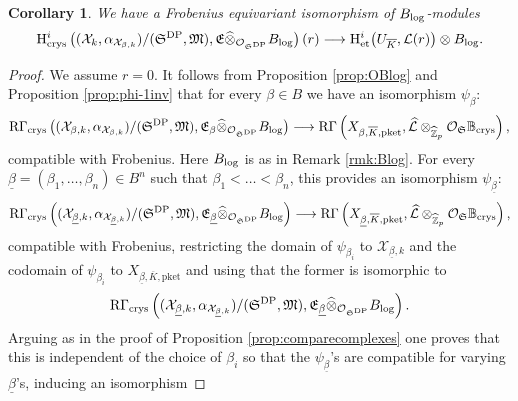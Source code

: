 \documentclass[asterisque,english]{smfart}
\newtheorem{cor}[theo]{Corollary}
\begin{document}
\begin{cor}\label{cor:isoHietcryslog} We have a Frobenius equivariant isomorphism of $B_{\rm log}$-modules $$\mathrm{H}^i_{\mathrm{crys}}\left((\mathcal{X}_k,\alpha_{\mathcal{X}_{\beta,k}})/(\mathfrak{S}^{\rm DP},\mathfrak{M}),\mathfrak{E} \widehat{\otimes}_{\mathcal{O}_{\mathfrak{S}^{\rm DP}}} B_{\rm log}\right)(r)\longrightarrow \mathrm{H}^i_{\mathrm{et}}\bigl(U_{\overline{K}},  \mathcal{L}(r)\bigr)\otimes  B_{\rm log}.$$

\end{cor}
\begin{proof} We assume $r=0$. It follows from Proposition \ref{prop:OBlog} and Proposition \ref{prop:phi-1inv} that for every $\beta\in B$ we have an isomorphism $\psi_{\beta}$: $$\mathrm{R}\Gamma_{\mathrm{crys}}\left((\mathcal{X}_{\beta,k},\alpha_{\mathcal{X}_{\beta,k}})/(\mathfrak{S}^{\rm DP},\mathfrak{M}),\mathfrak{E}_\beta \widehat{\otimes}_{\mathcal{O}_{\mathfrak{S}^{\rm DP}}} B_{\rm log}\right) \longrightarrow \mathrm{R}\Gamma\left(X_{\beta,\overline{K},\mathrm{pket}},\widehat{\mathcal{L}}\otimes_{\widehat{\mathbb{Z}}_p} \mathcal{O}_{\mathfrak{S}} \mathbb{B}_{\mathrm{crys}}\right),$$compatible with Frobenius. Here $B_{\rm log}$ is as in Remark \ref{rmk:Blog}. For every $\underline{\beta}=(\beta_1,\ldots,\beta_n) \in B^n$ such that $\beta_1<\ldots < \beta_n$, this provides an isomorphism  
$\psi_{\underline{\beta}}$: $$\mathrm{R}\Gamma_{\mathrm{crys}}\left((\mathcal{X}_{\underline{\beta},k},\alpha_{\mathcal{X}_{\underline{\beta},k}})/(\mathfrak{S}^{\rm DP},\mathfrak{M}),\mathfrak{E}_{\underline{\beta}} \widehat{\otimes}_{\mathcal{O}_{\mathfrak{S}^{\rm DP}}} B_{\rm log}\right)\longrightarrow \mathrm{R}\Gamma\left(X_{\underline{\beta},\overline{K},\mathrm{pket}},\widehat{\mathcal{L}}\otimes_{\widehat{\mathbb{Z}}_p} \mathcal{O}_{\mathfrak{S}} \mathbb{B}_{\mathrm{crys}}\right)   ,$$compatible with Frobenius,  restricting the domain of $\psi_{\beta_i}$ to  $\mathcal{X}_{\underline{\beta},k}$ and the codomain of $\psi_{\beta_i}$ to $X_{\underline{\beta},\overline{K},\mathrm{pket}}$ and using that the former is isomorphic to  $$ \mathrm{R}\Gamma_{\mathrm{crys}}\left((\mathcal{X}_{\underline{\beta},k},\alpha_{\mathcal{X}_{\underline{\beta},k}})/(\mathfrak{S}^{\rm DP},\mathfrak{M}),\mathfrak{E}_{\underline{\beta}} \widehat{\otimes}_{\mathcal{O}_{\mathfrak{S}^{\rm DP}}} B_{\rm log}\right) . $$Arguing as in the proof of Proposition \ref{prop:comparecomplexes} one proves that this is independent of the choice of $\beta_i$ so that the $\psi_{\underline{\beta}}$'s are compatible for varying $\underline{\beta}$'s, inducing an isomorphism 

\end{proof}
\end{document}
